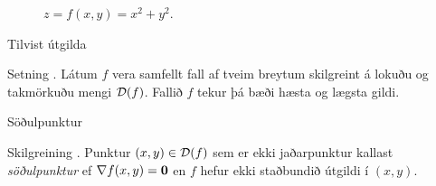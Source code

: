 \begin {frame}
\begin{figure}[!h]
\begin{minipage}{.5\textwidth}
            \caption*{$z= f(x,y) = x^2+y^2$.}
        \end{minipage}
    \end{figure}
\end {frame}




\begin{frame}{Tilvist útgilda} 

\begin {block}{Setning \kaflanr.}
Látum $f$ vera samfellt fall af tveim breytum
skilgreint á lokuðu og takmörkuðu mengi ${\cal D}(f)$.  Fallið $f$
  tekur þá bæði hæsta og lægsta gildi. 

\end{block}

\end{frame}


\begin{frame}{Söðulpunktur} 

\begin {block}{Skilgreining \kaflanr.}
 Punktur $(x,y)\in  {\cal D}(f)$ sem er ekki
jaðarpunktur kallast {\em \color{red} söðulpunktur} ef $\nabla f(x,y)=\mbox{${\bf 0}$}$ en $f$
hefur ekki staðbundið útgildi í $(x,y)$.
\end{block}

\end{frame}


